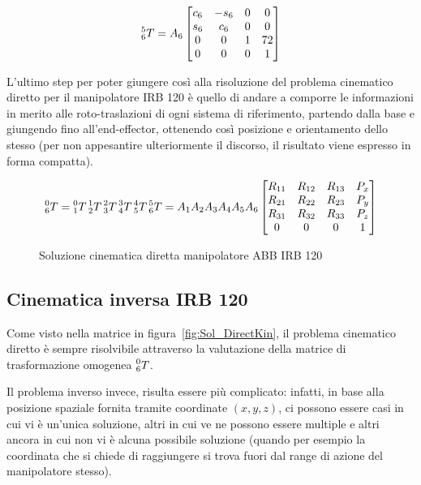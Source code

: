 \begin{equation*}
	\prescript{5}{6}{T}	= A_6
	\begin{bmatrix}
		c_6 & -s_6 & 0  & 0\\
		s_6 & c_6  & 0  & 0\\
		0   & 0    & 1  & 72\\
		0   & 0    & 0  & 1
	\end{bmatrix}
\end{equation*}

L'ultimo step per poter giungere così alla risoluzione del problema cinematico diretto per il manipolatore IRB 120 è quello di andare a comporre le informazioni in merito alle roto-traslazioni di ogni sistema di riferimento, partendo dalla base e giungendo fino all'end-effector, ottenendo così posizione e orientamento dello stesso (per non appesantire ulteriormente il discorso, il risultato viene espresso in forma compatta).
\begin{figure}[h]
	\label{fig:Sol_DirectKin}
	\begin{equation*}
		\prescript{0}{6}{T}	= \prescript{0}{1}{T} \prescript{1}{2}{T} \prescript{2}{3}{T} \prescript{3}{4}{T} \prescript{4}{5}{T} \prescript{5}{6}{T}  = A_1A_2A_3A_4A_5A_6
		\begin{bmatrix}
			R_{11} & R_{12} & R_{13} & P_x\\
			R_{21} & R_{22} & R_{23} & P_y\\
			R_{31} & R_{32} & R_{33} & P_z\\
			0    & 0    & 0    & 1
		\end{bmatrix}
	\end{equation*}	
	\caption{Soluzione cinematica diretta manipolatore ABB IRB 120}
\end{figure}

\subsection{Cinematica inversa IRB 120}
Come visto nella matrice in figura~\vref{fig:Sol_DirectKin}, il problema cinematico diretto è sempre risolvibile attraverso la valutazione della matrice di trasformazione omogenea  $\prescript{0}{6}{T}$.

Il problema inverso invece, risulta essere più complicato: infatti, in base alla posizione spaziale fornita tramite coordinate $(x,y,z)$, ci possono essere casi in cui vi è un'unica soluzione, altri in cui ve ne possono essere multiple e altri ancora in cui non vi è alcuna possibile soluzione (quando per esempio la coordinata che si chiede di raggiungere si trova fuori dal range di azione del manipolatore stesso).

